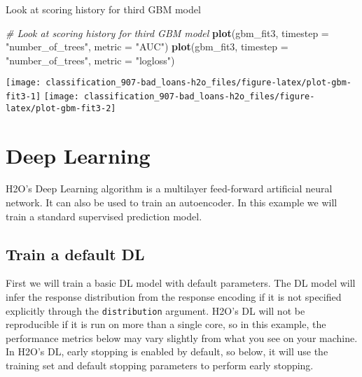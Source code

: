 \documentclass[]{book}
\newenvironment{Shaded}{\begin{snugshade}}{\end{snugshade}}
\newcommand{\CommentTok}[1]{\textcolor[rgb]{0.56,0.35,0.01}{\textit{#1}}}
\newcommand{\DataTypeTok}[1]{\textcolor[rgb]{0.13,0.29,0.53}{#1}}
\newcommand{\KeywordTok}[1]{\textcolor[rgb]{0.13,0.29,0.53}{\textbf{#1}}}
\newcommand{\NormalTok}[1]{#1}
\newcommand{\StringTok}[1]{\textcolor[rgb]{0.31,0.60,0.02}{#1}}
\begin{document}
Look at scoring history for third GBM model

\begin{Shaded}
\begin{Highlighting}[]
\CommentTok{# Look at scoring history for third GBM model}
\KeywordTok{plot}\NormalTok{(gbm_fit3, }
     \DataTypeTok{timestep =} \StringTok{"number_of_trees"}\NormalTok{, }
     \DataTypeTok{metric =} \StringTok{"AUC"}\NormalTok{)}
\KeywordTok{plot}\NormalTok{(gbm_fit3, }
     \DataTypeTok{timestep =} \StringTok{"number_of_trees"}\NormalTok{, }
     \DataTypeTok{metric =} \StringTok{"logloss"}\NormalTok{)}
\end{Highlighting}
\end{Shaded}

\begin{center}\texttt{[image: classification\_907-bad\_loans-h2o\_files/figure-latex/plot-gbm-fit3-1]} \texttt{[image: classification\_907-bad\_loans-h2o\_files/figure-latex/plot-gbm-fit3-2]} \end{center}

\hypertarget{deep-learning}{%
\section{Deep Learning}\label{deep-learning}}

H2O's Deep Learning algorithm is a multilayer feed-forward artificial neural network.
It can also be used to train an autoencoder. In this example we will train
a standard supervised prediction model.

\hypertarget{train-a-default-dl}{%
\subsection{Train a default DL}\label{train-a-default-dl}}

First we will train a basic DL model with default parameters. The DL model will infer the response distribution from the response encoding if it is not specified explicitly through the \texttt{distribution} argument. H2O's DL will not be reproducible if it is run on more than a single core, so in this example, the performance metrics below may vary slightly from what you see on your machine.
In H2O's DL, early stopping is enabled by default, so below, it will use the training set and default stopping parameters to perform early stopping.
\end{document}
